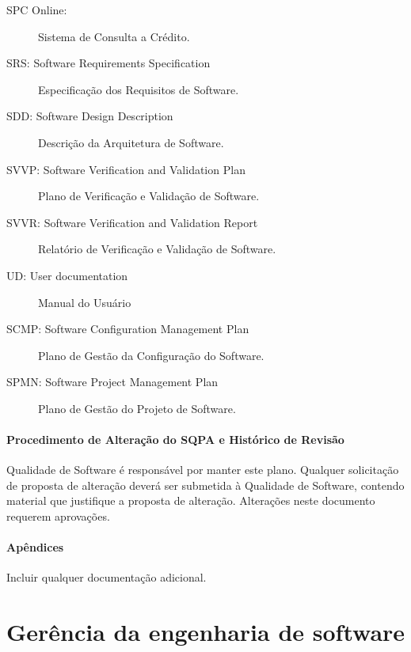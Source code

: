 \begin{itemize}
\begin{description}
\item [SPC Online:] Sistema de Consulta a Crédito.

\item [SRS: Software Requirements Specification] Especificação dos Requisitos de Software.

\item [SDD: Software Design Description] Descrição da Arquitetura de Software.

\item [SVVP: Software Verification and Validation Plan] Plano de Verificação e Validação de Software.

\item [SVVR: Software Verification and Validation Report] Relatório de Verificação e Validação de Software.

\item [UD: User documentation] Manual do Usuário

\item [SCMP: Software Configuration Management Plan] Plano de Gestão da Configuração do Software.

\item [SPMN: Software Project Management Plan] Plano de Gestão do Projeto de Software.
\end{description}

\paragraph{​Procedimento de Alteração do SQPA e Histórico de Revisão}

Qualidade de Software é responsável por manter este plano. Qualquer solicitação de proposta de alteração deverá ser submetida à Qualidade de Software, contendo material que justifique a proposta de alteração. Alterações neste documento requerem aprovações.

\paragraph{Apêndices}

Incluir qualquer documentação adicional.


\end{itemize}

\section{Gerência da engenharia de software}
\label{sec:gerenciaengenharia}

